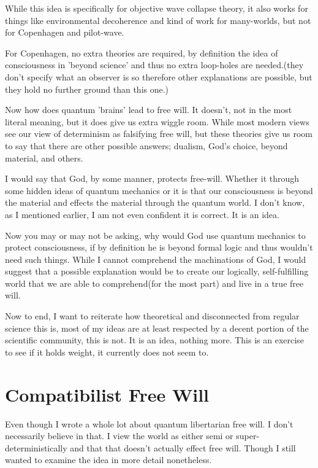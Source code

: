\par While this idea is specifically for objective wave collapse theory, it also works for things like environmental decoherence and kind of work for many-worlds, but not for Copenhagen and pilot-wave.
\par For Copenhagen, no extra theories are required, by definition the idea of consciousness in 'beyond science' and thus no extra loop-holes are needed.(they don't specify what an observer is so therefore other explanations are possible, but they hold no further ground than this one.)
\par Now how does quantum 'brains' lead to free will. It doesn't, not in the most literal meaning, but it does give us extra wiggle room. While most modern views see our view of determinism as falsifying free will, but these theories give us room to say that there are other possible answers; dualism, God's choice, beyond material, and others.
\par I would say that God, by some manner, protects free-will. Whether it through some hidden ideas of quantum mechanics or it is that our consciousness is beyond the material and effects the material through the quantum world. I don't know, as I mentioned earlier, I am not even confident it is correct. It is an idea.
\par Now you may or may not be asking, why would God use quantum mechanics to protect consciousness, if by definition he is beyond formal logic and thus wouldn't need such things. While I cannot comprehend the machinations of God, I would suggest that a possible explanation would be to create our logically, self-fulfilling world that we are able to comprehend(for the most part) and live in a true free will. 
\par Now to end, I want to reiterate how theoretical and disconnected from regular science this is, most of my ideas are at least respected by a decent portion of the scientific community, this is not. It is an idea, nothing more. This is an exercise to see if it holds weight, it currently does not seem to.
\section{Compatibilist Free Will}
\par Even though I wrote a whole lot about quantum libertarian free will. I don't necessarily believe in that. I view the world as either semi or super-deterministically and that that doesn't actually effect free will. Though I still wanted to examine the idea in more detail nonetheless.
